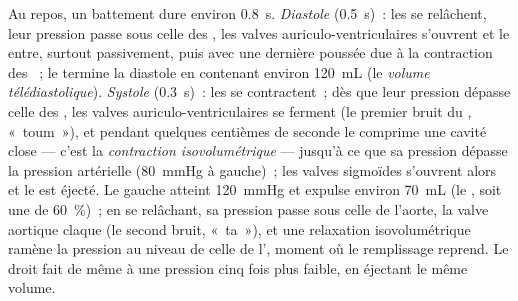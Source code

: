 \begin{proposition}\label{prop:b2:heart:cycle}
Au repos, un battement dure environ \qty{0.8}{s}. \emph{Diastole}
(\qty{0.5}{s})~: les  se relâchent, leur pression passe sous
celle des , les valves auriculo-ventriculaires s'ouvrent et
le  entre, surtout passivement, puis avec une dernière poussée due à
la contraction des ~; le  termine la diastole en
contenant environ \qty{120}{mL} (le \emph{volume télédiastolique}).
\emph{Systole} (\qty{0.3}{s})~: les  se contractent~; dès que
leur pression dépasse celle des , les valves
auriculo-ventriculaires se ferment (le premier bruit du , «~toum~»),
et pendant quelques centièmes de seconde le  comprime une
cavité close --- c'est la \emph{contraction isovolumétrique} --- jusqu'à
ce que sa pression dépasse la pression artérielle (\qty{80}{mmHg} à
gauche)~; les valves sigmoïdes s'ouvrent alors et le  est éjecté. Le
 gauche atteint \qty{120}{mmHg} et expulse environ
\qty{70}{mL} (le \emph{}, soit une
\emph{} de \qty{60}{\%})~; en se relâchant, sa
pression passe sous celle de l'aorte, la valve aortique claque (le
second bruit, «~ta~»), et une relaxation isovolumétrique ramène la
pression au niveau de celle de l', moment où le remplissage
reprend. Le  droit fait de même à une pression cinq fois plus
faible, en éjectant le même volume.
\end{proposition}

